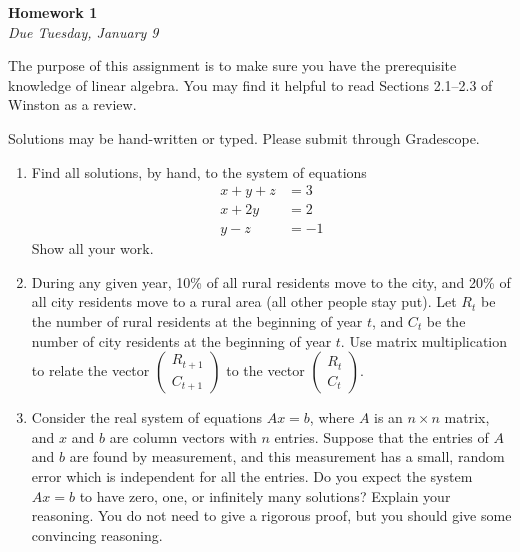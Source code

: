 \documentclass[oneside,12pt]{memoir}
\begin{document}
\begin{center}
\textbf{\large Homework 1} \\
\emph{Due Tuesday, January 9}
\end{center}

The purpose of this assignment is to make sure you have the prerequisite knowledge of linear algebra. You may find it helpful to read Sections 2.1--2.3 of Winston as a review.

Solutions may be hand-written or typed. Please submit through Gradescope.

\begin{enumerate}[leftmargin=*]

\item Find all solutions, by hand, to the system of equations
\begin{align*}
x + y + z &= 3 \\
x + 2y &= 2 \\
y - z &= -1
\end{align*}
Show all your work.

\item During any given year, 10\% of all rural residents move to the city, and 20\% of all city residents move to a rural area (all other people stay put). Let $R_t$ be the number of rural residents at the beginning of year $t$, and $C_t$ be the number of city residents at the beginning of year $t$. Use matrix multiplication to relate the vector $\begin{pmatrix}
R_{t+1} \\ C_{t+1} \end{pmatrix}$ to the vector $\begin{pmatrix}
R_{t} \\ C_{t} \end{pmatrix}$.

\item Consider the real system of equations $Ax = b$, where $A$ is an $n \times n$ matrix, and $x$ and $b$ are column vectors with $n$ entries. Suppose that the entries of $A$ and $b$ are found by measurement, and this measurement has a small, random error which is independent for all the entries. Do you expect the system $Ax = b$ to have zero, one, or infinitely many solutions? Explain your reasoning. You do not need to give a rigorous proof, but you should give some convincing reasoning.

\end{enumerate}
\end{document}
